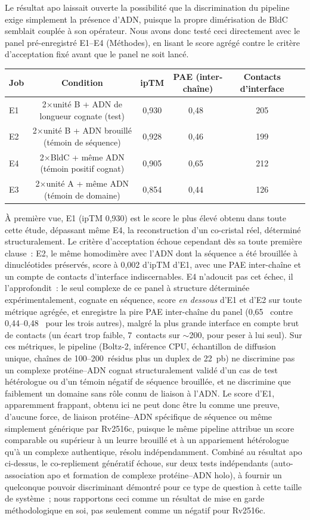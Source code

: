 \documentclass[11pt,a4paper]{article}
\newcommand{\ang}{\text{\AA}}
\begin{document}
Le résultat apo laissait ouverte la possibilité que la discrimination du pipeline exige simplement
la présence d'ADN, puisque la propre dimérisation de BldC semblait couplée à son opérateur. Nous
avons donc testé ceci directement avec le panel pré-enregistré E1--E4 (Méthodes), en lisant le score
agrégé contre le critère d'acceptation fixé avant que le panel ne soit lancé.
\begin{center}
\small
\begin{tabular}{@{}lccccc@{}}
\toprule
Job & Condition & ipTM & PAE (inter-chaîne) & Contacts d'interface \\
\midrule
E1 & 2$\times$unité B + ADN de longueur cognate (test) & 0,930 & 0,48~\ang{} & 205 \\
E2 & 2$\times$unité B + ADN brouillé (témoin de séquence) & 0,928 & 0,46~\ang{} & 199 \\
E4 & 2$\times$BldC + même ADN (témoin positif cognat) & 0,905 & 0,65~\ang{} & 212 \\
E3 & 2$\times$unité A + même ADN (témoin de domaine) & 0,854 & 0,44~\ang{} & 126 \\
\bottomrule
\end{tabular}
\end{center}
À première vue, E1 (ipTM 0,930) est le score le plus élevé obtenu dans toute cette étude, dépassant
même E4, la reconstruction d'un co-cristal réel, déterminé structuralement. Le critère
d'acceptation échoue cependant dès sa toute première clause~: E2, le même homodimère avec l'ADN dont
la séquence a été brouillée à dinucléotides préservés, score à 0,002 d'ipTM d'E1, avec une PAE
inter-chaîne et un compte de contacts d'interface indiscernables. E4 n'adoucit pas cet échec, il
l'approfondit~: le seul complexe de ce panel à structure déterminée expérimentalement, cognate en
séquence, score \emph{en dessous} d'E1 et d'E2 sur toute métrique agrégée, et enregistre la pire PAE
inter-chaîne du panel (0,65~\ang{} contre 0,44--0,48~\ang{} pour les trois autres), malgré la plus
grande interface en compte brut de contacts (un écart trop faible, 7~contacts sur $\sim$200, pour
peser à lui seul). Sur ces métriques, le pipeline (Boltz-2, inférence CPU, échantillon de diffusion
unique, chaînes de 100--200~résidus plus un duplex de 22~pb) ne discrimine pas un complexe
protéine--ADN cognat structuralement validé d'un cas de test hétérologue ou d'un témoin négatif de
séquence brouillée, et ne discrimine que faiblement un domaine sans rôle connu de liaison à l'ADN.
Le score d'E1, apparemment frappant, obtenu ici ne peut donc être lu comme une preuve, d'aucune
force, de liaison protéine--ADN spécifique de séquence ou même simplement générique par Rv2516c,
puisque le même pipeline attribue un score comparable ou supérieur à un leurre brouillé et à un
appariement hétérologue qu'à un complexe authentique, résolu indépendamment. Combiné au résultat apo
ci-dessus, le co-repliement génératif échoue, sur deux tests indépendants (auto-association apo et
formation de complexe protéine--ADN holo), à fournir un quelconque pouvoir discriminant démontré
pour ce type de question à cette taille de système~; nous rapportons ceci comme un résultat de mise
en garde méthodologique en soi, pas seulement comme un négatif pour Rv2516c.
\end{document}
